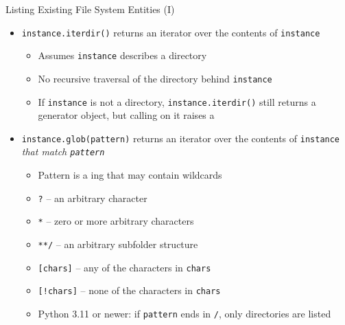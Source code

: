 \begin{frame}[fragile]{Listing Existing File System Entities (I)}
%
\begin{itemize}
\item \texttt{instance.iterdir()} returns an iterator over the contents of \texttt{instance}
	\begin{itemize}
	\item Assumes \texttt{instance} describes a directory
	\item No recursive traversal of the directory behind \texttt{instance}
	\item If \texttt{instance} is not a directory, \texttt{instance.iterdir()}  still returns a generator object, but calling  on it raises a 
	\end{itemize}
\item \texttt{instance.glob(pattern)} returns an iterator over the contents of \texttt{instance} \emph{that match \texttt{pattern}}
	\begin{itemize}
	\item Pattern is a ing that may contain wildcards
	\item \texttt{?} -- an arbitrary character
	\item \texttt{*} -- zero or more arbitrary characters
	\item \texttt{**/} -- an arbitrary subfolder structure
	\item \texttt{[chars]} -- any of the characters in \texttt{chars}
	\item \texttt{[!chars]} -- none of the characters in \texttt{chars}
	\item Python 3.11 or newer: if \texttt{pattern} ends in \texttt{/}, only directories are listed
	\end{itemize}
\end{itemize}
%
\end{frame}


